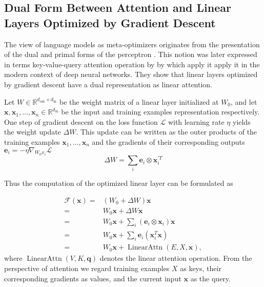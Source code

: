 \subsection{Dual Form Between Attention and Linear Layers Optimized by Gradient Descent}
\label{sec:icl_dual_1}

The view of language models as meta-optimizers originates from the presentation of the dual and primal forms of the perceptron \cite{Aizerman2019TheoreticalFO}.
This notion was later expressed in terms key-value-query attention operation by by \cite{irie22dual,dai2023gpt,pmlr-v202-von-oswald23a} which apply it apply it in the modern context of deep neural networks.
They show that linear layers optimized by gradient descent have a dual representation as linear attention.

Let $W \in \mathbb{R}^{d_{\text{out}} \times d_{\text{in}}}$ be the weight matrix of a linear layer initialized at $W_0$, and let $\mathbf{x}, \mathbf{x}_1, \dots, \mathbf{x}_n  \in \mathbb{R}^{d_{\text{in}}}$ be the input and training examples representation respectively.
One step of gradient descent on the loss function $\mathcal{L}$ with learning rate $\eta$ yields the weight update $\Delta W$.
This update can be written as the outer products of the training examples $\mathbf{x}_1, \dots, \mathbf{x}_n$ and the gradients of their corresponding outputs $\mathbf{e}_i = -\eta \nabla_{W_0 x_i}\mathcal{L}$
\begin{equation}
    \Delta W = \sum_i \mathbf{e}_i \otimes \mathbf{x}^{\prime T}_i
    \label{equ:dual_comp_2}
\end{equation}

Thus the computation of the optimized linear layer can be formulated as 

\begin{equation}
    \begin{aligned}
        \mathcal{F}(\mathbf{x}) = & \left( W_{0} + \Delta W \right) \mathbf{x} \\
        = & W_{0} \mathbf{x} + \Delta W \mathbf{x} \\
        = & W_{0} \mathbf{x} + \sum_i \left( \mathbf{e}_i \otimes \mathbf{x}_i\right) \mathbf{x} \\
        = & W_{0} \mathbf{x} + \sum_i \mathbf{e}_i \left( \mathbf{x}^{T}_i \mathbf{x} \right) \\
        = & W_{0} \mathbf{x} + \operatorname{LinearAttn} \left( E, X, \mathbf{x} \right), 
    \end{aligned}
    \label{equ:sgd_attn_dual}
\end{equation}
where $\operatorname{LinearAttn}(V, K, \mathbf{q})$ denotes the linear attention operation.
From the perspective of attention we regard training examples $X$ as keys, their corresponding gradients as values, and the current input $\mathbf{x}$ as the query.


